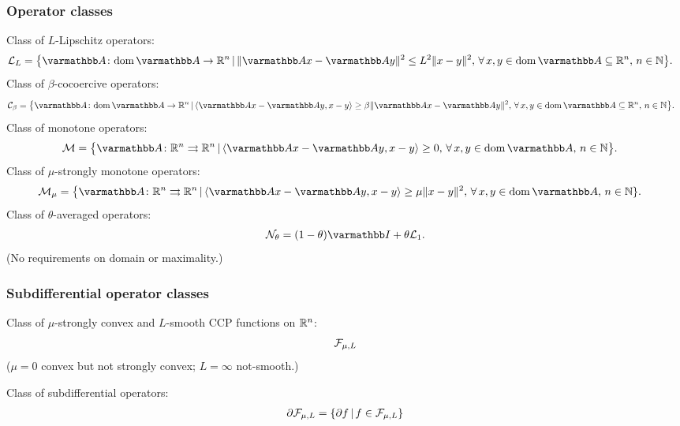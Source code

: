 \documentclass[10pt,mathserif]{beamer}
\begin{document}
\begin{frame}[fragile]
\frametitle{Operator classes}
Class of $L$-Lipschitz operators:
\begingroup\makeatletter\def\f@size{8}\check@mathfonts
\begin{align*}
\cL_{L}&=\big\{\opA\colon\dom{\opA}\rightarrow\reals^n\,|\,\| \opA x-\opA y\|^2\le L^2\|x-y\|^2,\,\forall\, x,y\in\dom{\opA}\subseteq\reals^n,\,n\in \mathbb{N}\big\}.
\end{align*}
\endgroup
Class of $\beta$-cocoercive operators:
\begingroup\makeatletter\def\f@size{8}\check@mathfonts
\begin{align*}
\cC_{\beta }&=\big\{\opA\colon\dom{\opA}\rightarrow\reals^n\,|\,\langle \opA x-\opA y,x-y\rangle\ge \beta\|\opA x-\opA y\|^2,\,\forall\, x,y\in\dom{\opA}\subseteq\reals^n,\,n\in \mathbb{N}\big\}.
\end{align*}
\endgroup
Class of monotone operators:
\begingroup\makeatletter\def\f@size{8}\check@mathfonts
\begin{align*}
\cM&=\big\{\opA\colon\reals^n\rightrightarrows\reals^n\,|\,\langle \opA x-\opA y,x-y\rangle\ge 0,\,\forall\, x,y\in\dom{\opA},\,n\in \mathbb{N}\big\}.
\end{align*}
\endgroup
Class of $\mu$-strongly monotone operators:
\begingroup\makeatletter\def\f@size{8}\check@mathfonts
\begin{align*}
\cM_{\mu}&=\big\{\opA\colon\reals^n\rightrightarrows\reals^n\,|\,\langle \opA x-\opA y,x-y\rangle\ge \mu\|x-y\|^2,\,\forall\, x,y\in\dom{\opA},\,n\in \mathbb{N}\}.
\end{align*}
\endgroup
Class of $\theta$-averaged operators:
\begin{align*}
\cN_\theta=(1-\theta)\opI+\theta\cL_1.
\end{align*}
(No requirements on domain or maximality.)
\end{frame}

\begin{frame}
\frametitle{Subdifferential operator classes}
Class of $\mu$-strongly convex and $L$-smooth CCP functions on $\mathbb{R}^n$:
 \[
{\mathcal{F}}_{\mu,L}
\]
($\mu=0$ convex but not strongly convex; $L=\infty$ not-smooth.)

\vspace{0.2in}
Class of subdifferential operators:
\begin{align*}
\partial {\mathcal{F}}_{\mu,L} = \{\partial f \,|\, f \in  {\mathcal{F}}_{\mu,L}\}
\end{align*}
\end{frame}
\end{document}

